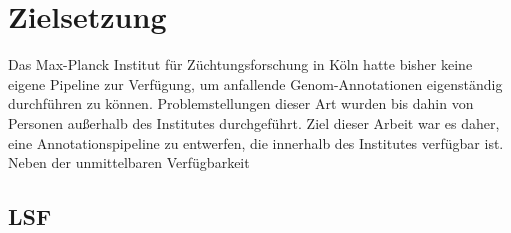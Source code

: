 \chapter{Zielsetzung}
Das Max-Planck Institut für Züchtungsforschung in Köln hatte bisher keine
eigene Pipeline zur Verfügung, um anfallende Genom-Annotationen eigenständig
durchführen zu können. Problemstellungen dieser Art wurden bis dahin von
Personen außerhalb des Institutes durchgeführt.
Ziel dieser Arbeit war es daher, eine Annotationspipeline zu entwerfen, die
innerhalb des Institutes verfügbar ist. Neben der unmittelbaren Verfügbarkeit
\section{LSF}